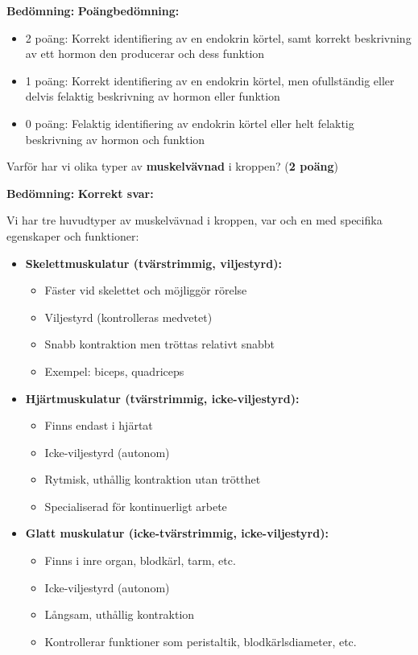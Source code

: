 \documentclass{exam}
\newenvironment{answer}
  {\begin{framed}\color{blue}\textbf{Bedömning:} }
  {\end{framed}}
\begin{document}
\begin{questions}
\begin{answer}
\textbf{Poängbedömning:}
\begin{itemize}
  \item 2 poäng: Korrekt identifiering av en endokrin körtel, samt korrekt beskrivning av ett hormon den producerar och dess funktion
  \item 1 poäng: Korrekt identifiering av en endokrin körtel, men ofullständig eller delvis felaktig beskrivning av hormon eller funktion
  \item 0 poäng: Felaktig identifiering av endokrin körtel eller helt felaktig beskrivning av hormon och funktion
\end{itemize}
\end{answer}
\vspace{5mm}

\question Varför har vi olika typer av \textbf{muskelvävnad} i kroppen? (\textbf{2 poäng})
\vspace{10mm}

\begin{answer}
\textbf{Korrekt svar:}

Vi har tre huvudtyper av muskelvävnad i kroppen, var och en med specifika egenskaper och funktioner:

\begin{itemize}
  \item \textbf{Skelettmuskulatur (tvärstrimmig, viljestyrd):}
  \begin{itemize}
    \item Fäster vid skelettet och möjliggör rörelse
    \item Viljestyrd (kontrolleras medvetet)
    \item Snabb kontraktion men tröttas relativt snabbt
    \item Exempel: biceps, quadriceps
  \end{itemize}
  
  \item \textbf{Hjärtmuskulatur (tvärstrimmig, icke-viljestyrd):}
  \begin{itemize}
    \item Finns endast i hjärtat
    \item Icke-viljestyrd (autonom)
    \item Rytmisk, uthållig kontraktion utan trötthet
    \item Specialiserad för kontinuerligt arbete
  \end{itemize}
  
  \item \textbf{Glatt muskulatur (icke-tvärstrimmig, icke-viljestyrd):}
  \begin{itemize}
    \item Finns i inre organ, blodkärl, tarm, etc.
    \item Icke-viljestyrd (autonom)
    \item Långsam, uthållig kontraktion
    \item Kontrollerar funktioner som peristaltik, blodkärlsdiameter, etc.
  \end{itemize}
\end{itemize}


\end{answer}
\end{questions}
\end{document}
